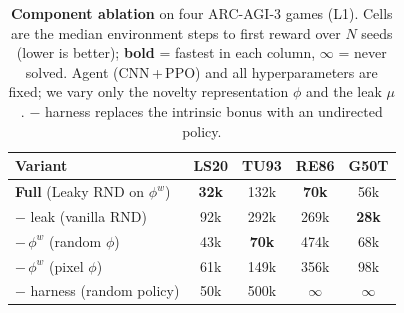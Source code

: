 \newcommand{\TBD}{\textcolor{gray}{--}}  %
\begin{table}[t]
  \centering
  \caption{\textbf{Component ablation} on four ARC-AGI-3 games (L1). Cells are the median environment steps to first reward over $N$ seeds (lower is better); \textbf{bold} = fastest in each column, $\infty$ = never solved. Agent (CNN\,+\,PPO) and all hyperparameters are fixed; we vary only the novelty representation $\phi$ and the leak $\mu$. $-$ harness replaces the intrinsic bonus with an undirected policy.}
  \label{tab:ablation}
  \begin{tabular}{lcccc}
    \toprule
    Variant & LS20 & TU93 & RE86 & G50T \\
    \midrule
    \textbf{Full} (Leaky RND on $\phi^w$) & \textbf{32k} & 132k & \textbf{70k} & 56k \\
    \quad $-$ leak (vanilla RND) & 92k & 292k & 269k & \textbf{28k} \\
    \quad $-\,\phi^w$ (random $\phi$) & 43k & \textbf{70k} & 474k & 68k \\
    \quad $-\,\phi^w$ (pixel $\phi$) & 61k & 149k & 356k & 98k \\
    \midrule
    $-$ harness (random policy) & 50k & 500k & $\infty$ & $\infty$ \\
    \bottomrule
  \end{tabular}
\end{table}
